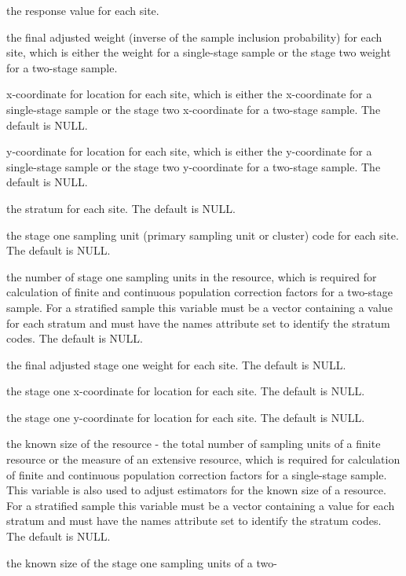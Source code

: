 \begin{Arguments}
\begin{ldescription}
\item[\code{z}] the response value for each site.
\item[\code{wgt}] the final adjusted weight (inverse of the sample inclusion
probability) for each site, which is either the weight for a 
single-stage sample or the stage two weight for a two-stage sample.
\item[\code{x}] x-coordinate for location for each site, which is either the
x-coordinate for a single-stage sample or the stage two 
x-coordinate for a two-stage sample.  The default is NULL.
\item[\code{y}] y-coordinate for location for each site, which is either the
y-coordinate for a single-stage sample or the stage two 
y-coordinate for a two-stage sample.  The default is NULL.
\item[\code{stratum}] the stratum for each site.  The default is NULL.
\item[\code{cluster}] the stage one sampling unit (primary sampling unit or cluster) 
code for each site.  The default is NULL.
\item[\code{N.cluster}] the number of stage one sampling units in the resource, which 
is required for calculation of finite and continuous population 
correction factors for a two-stage sample.  For a stratified sample 
this variable must be a vector containing a value for each stratum and
must have the names attribute set to identify the stratum codes.  The
default is NULL.
\item[\code{wgt1}] the final adjusted stage one weight for each site.  The default
is NULL.
\item[\code{x1}] the stage one x-coordinate for location for each site.  The default
is NULL.
\item[\code{y1}] the stage one y-coordinate for location for each site.  The default
is NULL.
\item[\code{popsize}] the known size of the resource - the total number of sampling 
units of a finite resource or the measure of an extensive resource,
which is required for calculation of finite and continuous population 
correction factors for a single-stage sample.  This variable is also 
used to adjust estimators for the known size of a resource.  For a
stratified sample this variable must be a vector containing a value 
for each stratum and must have the names attribute set to identify the
stratum codes.  The default is NULL.
\item[\code{stage1size}] the known size of the stage one sampling units of a two-

\end{ldescription}
\end{Arguments}
